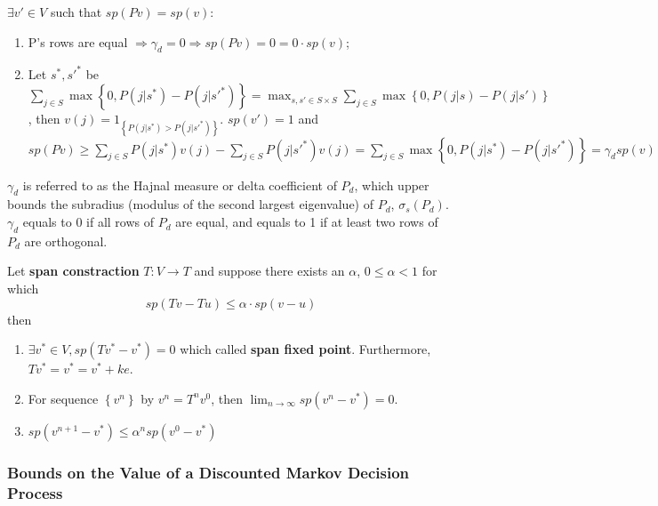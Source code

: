 $ \exists v' \in V $ such that $ sp(Pv) = sp(v) $:
\begin{enumerate}
    \item P's rows are equal $\Rightarrow \gamma_d = 0 \Rightarrow sp(Pv) = 0 = 0 \cdot sp(v)$;
    \item Let $ s^*, s'^* $ be $ \sum^{}_{j\in S} \max\left\{ 0, P(j|s^*) - P(j|s'^*) \right\} = \max_{s, s' \in S \times S} \sum^{}_{j\in S} \max\left\{ 0, P(j|s) - P(j|s') \right\}$, then $ v(j) = 1_{\left\{ P(j|s^*) > P(j|s'^*) \right\}} $.
        $ sp(v') = 1 $ and $ sp(Pv) \ge \sum^{}_{j \in S} P(j | s^*) v(j) - \sum^{}_{j\in S} P(j | s'^*) v(j) = \sum^{}_{j \in S} \max\left\{ 0, P(j | s^*) - P(j | s'^*) \right\} = \gamma_d sp(v)$
\end{enumerate}

$ \gamma_d $ is referred to as the Hajnal measure or delta coefficient of $ P_d $, which upper bounds the subradius (modulus of the second largest eigenvalue) of $ P_d $, $ \sigma_s(P_d) $. $ \gamma_d $ equals to 0 if all rows of $ P_d $ are equal, and equals to 1 if at least two rows of $ P_d $ are orthogonal.

\begin{theorem}
    Let \textbf{span constraction} $ T: V \rightarrow T $ and suppose there exists an $ \alpha $, $ 0 \le \alpha < 1 $ for which
    \[
        sp(Tv - Tu) \le \alpha \cdot sp(v - u)
    \]
    then
    \begin{enumerate}
        \item $ \exists v^* \in V, sp(Tv^* - v^*) = 0 $ which called \textbf{span fixed point}. Furthermore, $ Tv^* = v^* = v^* + ke $.
        \item For sequence $ \left\{ v^n \right\} $ by $ v^n = T^n v^0 $, then $ \lim_{n \rightarrow \infty} sp(v^n - v^*) = 0 $.
        \item $ sp(v^{n+1} - v^*) \le \alpha^n sp(v^0 - v^*) $
    \end{enumerate}
\end{theorem}

\subsubsection{Bounds on the Value of a Discounted Markov Decision Process}%
\label{ssub:bounds_on_the_value_of_a_discounted_markov_decision_process}

